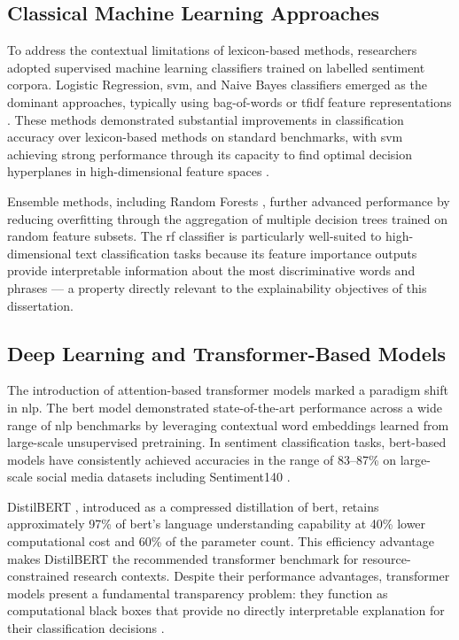 \subsection{Classical Machine Learning Approaches}

To address the contextual limitations of lexicon-based methods, researchers adopted supervised machine learning classifiers trained on labelled sentiment corpora. Logistic Regression, \gls{svm}, and Naive Bayes classifiers emerged as the dominant approaches, typically using bag-of-words or \gls{tfidf} feature representations \citep{pang2008opinion}. These methods demonstrated substantial improvements in classification accuracy over lexicon-based methods on standard benchmarks, with \gls{svm} achieving strong performance through its capacity to find optimal decision hyperplanes in high-dimensional feature spaces \citep{adugna2022comparison}.

Ensemble methods, including Random Forests \citep{breiman2001random}, further advanced performance by reducing overfitting through the aggregation of multiple decision trees trained on random feature subsets. The \gls{rf} classifier is particularly well-suited to high-dimensional text classification tasks because its feature importance outputs provide interpretable information about the most discriminative words and phrases --- a property directly relevant to the explainability objectives of this dissertation.

\subsection{Deep Learning and Transformer-Based Models}

The introduction of attention-based transformer models marked a paradigm shift in \gls{nlp}. The \gls{bert} model \citep{devlin2019bert} demonstrated state-of-the-art performance across a wide range of \gls{nlp} benchmarks by leveraging contextual word embeddings learned from large-scale unsupervised pretraining. In sentiment classification tasks, \gls{bert}-based models have consistently achieved accuracies in the range of 83--87\% on large-scale social media datasets including Sentiment140 \citep{sun2019fine}.

DistilBERT \citep{sanh2019distilbert}, introduced as a compressed distillation of \gls{bert}, retains approximately 97\% of \gls{bert}'s language understanding capability at 40\% lower computational cost and 60\% of the parameter count. This efficiency advantage makes DistilBERT the recommended transformer benchmark for resource-constrained research contexts. Despite their performance advantages, transformer models present a fundamental transparency problem: they function as computational black boxes that provide no directly interpretable explanation for their classification decisions \citep{danilevsky2020survey}.

